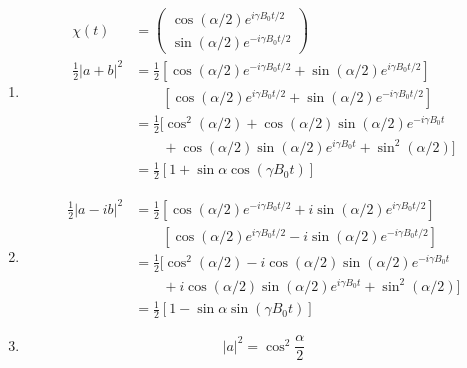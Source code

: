 \documentclass{article}
\begin{document}
\begin{enumerate}
  \item

        \begin{align*}
          \chi(t)               & = \begin{pmatrix}
                                      \cos (\alpha / 2) e^{i \gamma B_0 t / 2} \\
                                      \sin (\alpha / 2) e^{-i \gamma B_0 t / 2}
                                    \end{pmatrix}                                                           \\
          \frac{1}{2} |a + b|^2 & = \frac{1}{2} [\cos (\alpha / 2) e^{-i \gamma B_0 t / 2} + \sin (\alpha / 2) e^{i \gamma B_0 t / 2}] \\
                                & \qquad [\cos (\alpha / 2) e^{i \gamma B_0 t / 2} + \sin (\alpha / 2) e^{-i \gamma B_0 t / 2}]        \\
                                & = \frac{1}{2} [\cos^2 (\alpha / 2) + \cos (\alpha / 2) \sin (\alpha / 2) e^{-i \gamma B_0 t}         \\
                                & \qquad + \cos (\alpha / 2) \sin (\alpha / 2) e^{i \gamma B_0 t} + \sin^2 (\alpha / 2)]               \\
                                & = \frac{1}{2} [1 + \sin \alpha \cos (\gamma B_0 t)]
        \end{align*}

  \item

        \begin{align*}
          \frac{1}{2} |a - i b|^2 & = \frac{1}{2} [\cos (\alpha / 2) e^{-i \gamma B_0 t / 2} + i \sin (\alpha / 2) e^{i \gamma B_0 t / 2}] \\
                                  & \qquad [\cos (\alpha / 2) e^{i \gamma B_0 t / 2} - i \sin (\alpha / 2) e^{-i \gamma B_0 t / 2}]        \\
                                  & = \frac{1}{2} [\cos^2 (\alpha / 2) - i \cos (\alpha / 2) \sin (\alpha / 2) e^{-i \gamma B_0 t}         \\
                                  & \qquad + i \cos (\alpha / 2) \sin (\alpha / 2) e^{i \gamma B_0 t} + \sin^2 (\alpha / 2)]               \\
                                  & = \frac{1}{2} [1 - \sin \alpha \sin (\gamma B_0 t)]
        \end{align*}

  \item \[|a|^2 = \cos^2 \frac{\alpha}{2}\]
\end{enumerate}
\end{document}
